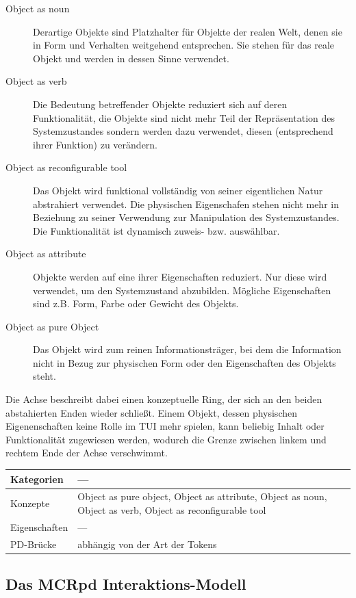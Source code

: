 \begin{description}
	\item[Object as noun] Derartige Objekte sind Platzhalter für Objekte der realen Welt, denen sie in Form und Verhalten weitgehend entsprechen. Sie stehen für das reale Objekt und werden in dessen Sinne verwendet.
	\item[Object as verb] Die Bedeutung betreffender Objekte reduziert sich auf deren Funktionalität, die Objekte sind nicht mehr Teil der Repräsentation des Systemzustandes sondern werden dazu verwendet, diesen (entsprechend ihrer Funktion) zu verändern.
	\item[Object as reconfigurable tool] Das Objekt wird funktional vollständig von seiner eigentlichen Natur abstrahiert verwendet. Die physischen Eigenschafen stehen nicht mehr in Beziehung zu seiner Verwendung zur Manipulation des Systemzustandes. Die Funktionalität ist dynamisch zuweis- bzw. auswählbar.
	\item[Object as attribute] Objekte werden auf eine ihrer Eigenschaften reduziert. Nur diese wird verwendet, um den Systemzustand abzubilden. Mögliche Eigenschaften sind z.B. Form, Farbe oder Gewicht des Objekts.
	\item[Object as pure Object] Das Objekt wird zum reinen Informationsträger, bei dem die Information nicht in Bezug zur physischen Form oder den Eigenschaften des Objekts steht.
\end{description}

Die Achse beschreibt dabei einen konzeptuelle Ring, der sich an den beiden abstahierten Enden wieder schließt. Einem Objekt, dessen physischen Eigenenschaften keine Rolle im \gls{TUI} mehr spielen, kann beliebig Inhalt oder Funktionalität zugewiesen werden, wodurch die Grenze zwischen linkem und rechtem Ende der Achse verschwimmt.

\begin{tabular}{| p{3cm} | p{10cm} |}
  \hline
  Kategorien & --- \\ \hline
  Konzepte & Object as pure object, Object as attribute, Object as noun, Object as verb, Object as reconfigurable tool  \\ \hline
  Eigenschaften & --- \\ \hline
  PD-Brücke & abhängig von der Art der Tokens  \\ \hline
\end{tabular} 

\subsection{Das MCRpd Interaktions-Modell}
\label{sub:mcrpd}

